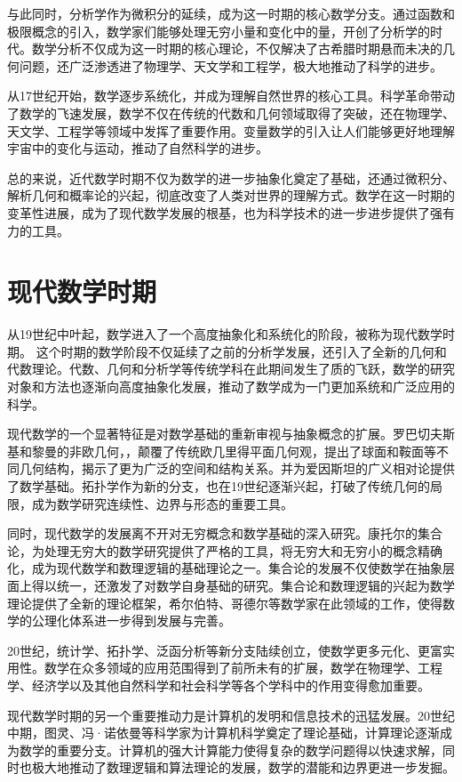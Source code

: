 与此同时，分析学作为微积分的延续，成为这一时期的核心数学分支。通过函数和极限概念的引入，数学家们能够处理无穷小量和变化中的量，开创了分析学的时代。数学分析不仅成为这一时期的核心理论，不仅解决了古希腊时期悬而未决的几何问题，还广泛渗透进了物理学、天文学和工程学，极大地推动了科学的进步。

从17世纪开始，数学逐步系统化，并成为理解自然世界的核心工具。科学革命带动了数学的飞速发展，数学不仅在传统的代数和几何领域取得了突破，还在物理学、天文学、工程学等领域中发挥了重要作用。变量数学的引入让人们能够更好地理解宇宙中的变化与运动，推动了自然科学的进步。

总的来说，近代数学时期不仅为数学的进一步抽象化奠定了基础，还通过微积分、解析几何和概率论的兴起，彻底改变了人类对世界的理解方式。数学在这一时期的变革性进展，成为了现代数学发展的根基，也为科学技术的进一步进步提供了强有力的工具。

\section{现代数学时期}
从19世纪中叶起，数学进入了一个高度抽象化和系统化的阶段，被称为现代数学时期。
这个时期的数学阶段不仅延续了之前的分析学发展，还引入了全新的几何和代数理论。代数、几何和分析学等传统学科在此期间发生了质的飞跃，数学的研究对象和方法也逐渐向高度抽象化发展，推动了数学成为一门更加系统和广泛应用的科学。

现代数学的一个显著特征是对数学基础的重新审视与抽象概念的扩展。罗巴切夫斯基和黎曼的非欧几何，，颠覆了传统欧几里得平面几何观，提出了球面和鞍面等不同几何结构，揭示了更为广泛的空间和结构关系。并为爱因斯坦的广义相对论提供了数学基础。拓扑学作为新的分支，也在19世纪逐渐兴起，打破了传统几何的局限，成为数学研究连续性、边界与形态的重要工具。

同时，现代数学的发展离不开对无穷概念和数学基础的深入研究。康托尔的集合论，为处理无穷大的数学研究提供了严格的工具，将无穷大和无穷小的概念精确化，成为现代数学和数理逻辑的基础理论之一。集合论的发展不仅使数学在抽象层面上得以统一，还激发了对数学自身基础的研究。集合论和数理逻辑的兴起为数学理论提供了全新的理论框架，希尔伯特、哥德尔等数学家在此领域的工作，使得数学的公理化体系进一步得到发展与完善。

20世纪，统计学、拓扑学、泛函分析等新分支陆续创立，使数学更多元化、更富实用性。数学在众多领域的应用范围得到了前所未有的扩展，数学在物理学、工程学、经济学以及其他自然科学和社会科学等各个学科中的作用变得愈加重要。

现代数学时期的另一个重要推动力是计算机的发明和信息技术的迅猛发展。20世纪中期，图灵、冯·诺依曼等科学家为计算机科学奠定了理论基础，计算理论逐渐成为数学的重要分支。计算机的强大计算能力使得复杂的数学问题得以快速求解，同时也极大地推动了数理逻辑和算法理论的发展，数学的潜能和边界更进一步发掘。

